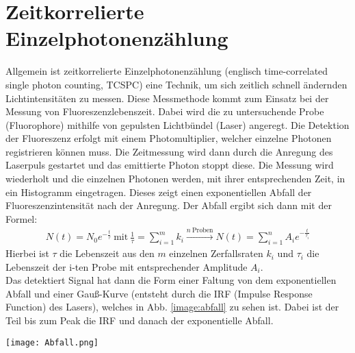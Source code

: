 \section{Zeitkorrelierte Einzelphotonenzählung}
Allgemein ist zeitkorrelierte Einzelphotonenzählung (englisch time-correlated single photon counting, TCSPC) eine Technik, um sich zeitlich schnell ändernden Lichtintensitäten zu messen. Diese Messmethode kommt zum Einsatz bei der Messung von Fluoreszenzlebenszeit. Dabei wird die zu untersuchende Probe (Fluorophore) mithilfe von gepulsten Lichtbündel (Laser) angeregt. Die Detektion der Fluoreszenz erfolgt mit einem Photomultiplier, welcher einzelne Photonen registrieren können muss. Die Zeitmessung wird dann durch die Anregung des Laserpuls gestartet und das emittierte Photon stoppt diese. Die Messung wird wiederholt und die einzelnen Photonen werden, mit ihrer entsprechenden Zeit, in ein Histogramm eingetragen. Dieses zeigt einen exponentiellen Abfall der Fluoreszenzintensität nach der Anregung. Der Abfall ergibt sich dann mit der Formel:
\begin{gather}
    N(t) = N_0e^{-\frac{t}{\tau}}~\text{mit}~\frac{1}{\tau} = \sum^m_{i=1} k_i \xrightarrow{n~\text{Proben}} N(t) = \sum_{i=1}^n A_ie^{-\frac{t}{\tau_i}} 
\end{gather} 
Hierbei ist $\tau$ die Lebenszeit aus den $m$ einzelnen Zerfallsraten $k_i$ und $\tau_i$ die Lebenszeit der i-ten Probe mit entsprechender Amplitude $A_i$.\\
Das detektiert Signal hat dann die Form einer Faltung von dem exponentiellen Abfall und einer Gauß-Kurve (entsteht durch die IRF (Impulse Response Function) des Lasers), welches in Abb. \ref{image:abfall} zu sehen ist. Dabei ist der Teil bis zum Peak die IRF und danach der exponentielle Abfall.
\begin{center}
    \texttt{[image: Abfall.png]}
    \label{image:abfall}
\end{center}
\newpage
